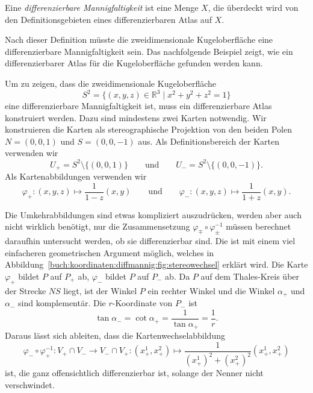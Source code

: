 \begin{definition}
Eine {\em differenzierbare Mannigfaltigkeit} ist eine Menge $X$, die überdeckt
wird von den Definitionsgebieten eines differenzierbaren Atlas auf $X$.
%
%
\end{definition}

Nach dieser Definition müsste die zweidimensionale Kugeloberfläche eine
differenzierbare Mannigfaltigkeit sein.
Das nachfolgende Beispiel zeigt, wie ein differenzierbarer Atlas
für die Kugeloberfläche gefunden werden kann.

\begin{beispiel}
Um zu zeigen, dass die zweidimensionale Kugeloberfläche
\[
S^2
=
\{
(x,y,z)\in\mathbb{R}^3
\mid
x^2 + y^2 + z^2 = 1
\}
\]
eine differenzierbare Mannigfaltigkeit ist, muss ein differenzierbare
Atlas konstruiert werden.
Dazu sind mindestens zwei Karten notwendig.
Wir konstruieren die Karten als stereographische Projektion von den
beiden Polen $N=(0,0,1)$ und $S=(0,0,-1)$ aus.
Als Definitionsbereich der Karten verwenden wir
\[
U_+
=
S^2\setminus \{ (0,0,1)\}
\qquad\text{und}\qquad
U_-
=
S^2\setminus \{ (0,0,-1)\}.
\]
Als Kartenabbildungen verwenden wir
\[
\varphi_+
\colon
(x,y,z)
\mapsto
\frac{1}{1-z}
(x,y)
\qquad\text{und}\qquad
\varphi_-
\colon
(x,y,z)
\mapsto
\frac{1}{1+z}
(x,y).
\]



Die Umkehrabbildungen sind etwas kompliziert auszudrücken, werden
aber auch nicht wirklich benötigt, nur die Zusammensetzung
$\varphi_{\mp}\circ\varphi_{\pm}^{-1}$ müssen berechnet daraufhin
untersucht werden, ob sie differenzierbar sind.
%
Die ist mit einem viel einfacheren geometrischen Argument möglich,
welches in Abbildung~\ref{buch:koordinaten:diffmannig:fig:stereowechsel}
erklärt wird.
Die Karte $\varphi_+$ bildet $P$ auf $P_+$ ab, $\varphi_-$ bildet
$P$ auf $P_-$ ab.
Da $P$ auf dem Thales-Kreis über der Strecke $NS$ liegt, ist der Winkel
$P$ ein rechter Winkel und die Winkel $\alpha_+$ und $\alpha_-$ sind
komplementär.
Die $r$-Koordinate von $P_-$ ist 
\[
\tan \alpha_-
=
\cot \alpha_+
=
\frac1{\tan\alpha_+}
=
\frac1{r}.
\]
Daraus lässt sich ableiten, dass die Kartenwechselabbildung
\[
\varphi_-\circ\varphi_+^{-1}
\colon
V_+\cap V_- \to V_-\cap V_+
:
(x^1_+,x^2_+)
\mapsto
\frac{1}{(x_+^1)^2 + (x_+^2)^2}(x_+^1,x_+^2)
\]
ist, die ganz offensichtlich differenzierbar ist, solange der 
Nenner nicht verschwindet.
\end{beispiel}

